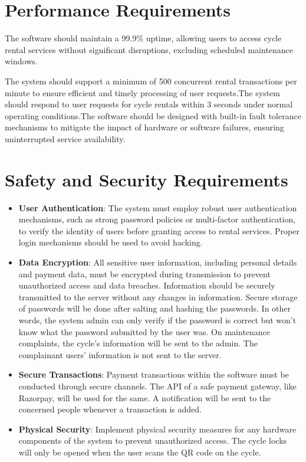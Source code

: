 \documentclass{scrreprt}
\begin{document}
\section{Performance Requirements}
The software should maintain a 99.9\% uptime, allowing users to access cycle rental services without significant disruptions, excluding scheduled maintenance windows.

The system should support a minimum of 500 concurrent rental transactions per minute to ensure efficient and timely processing of user requests.The system should respond to user requests for cycle rentals within 3 seconds under normal operating conditions.The software should be designed with built-in fault tolerance mechanisms to mitigate the impact of hardware or software failures, ensuring uninterrupted service availability.

\section{Safety and Security Requirements}
\begin{itemize}
    \item \textbf{User Authentication}: The system must employ robust user authentication mechanisms, such as strong password policies or multi-factor authentication, to verify the identity of users before granting access to rental services. Proper login mechanisms should be used to avoid hacking.
    \item \textbf{Data Encryption}: All sensitive user information, including personal details and payment data, must be encrypted during transmission to prevent unauthorized access and data breaches. Information should be securely transmitted to the server without any changes in information. Secure storage of passwords will be done after salting and hashing the passwords. In other words, the system admin can only verify if the password is correct but won’t know what the password submitted by the user was. On maintenance complaints, the cycle’s information will be sent to the admin. The complainant users’ information is not sent to the server.
    \item \textbf{Secure Transactions}: Payment transactions within the software must be conducted through secure channels. The API of a safe payment gateway, like Razorpay, will be used for the same. A notification will be sent to the concerned people whenever a transaction is added.
    \item \textbf{Physical Security}: Implement physical security measures for any hardware components of the system to prevent unauthorized access. The cycle locks will only be opened when the user scans the QR code on the cycle.
\end{itemize}
\end{document}
